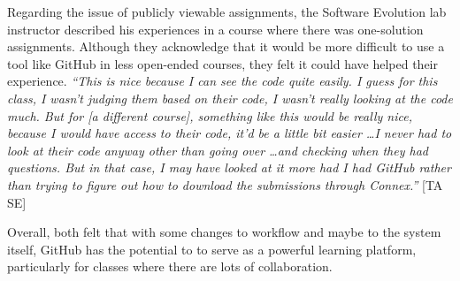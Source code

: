 Regarding the issue of publicly viewable assignments, the Software Evolution lab instructor described his experiences in a course where there was one-solution assignments. Although they acknowledge that it would be more difficult to use a tool like GitHub in less open-ended courses, they felt it could have helped their experience. \textit{``This is nice because I can see the code quite easily. I guess for this class, I wasn't judging them based on their code, I wasn't really looking at the code much. But for [a different course], something like this would be really nice, because I would have access to their code, it'd be a little bit easier \ldots I never had to look at their code anyway other than going over \ldots and checking when they had questions. But in that case, I may have looked at it more had I had GitHub rather than trying to figure out how to download the submissions through Connex.''} [TA SE]

Overall, both felt that with some changes to workflow and maybe to the system itself, GitHub has the potential to to serve as a powerful learning platform, particularly for classes where there are lots of collaboration.








